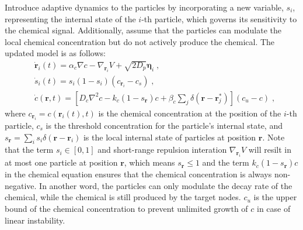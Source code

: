 \documentclass{article}
\begin{document}
Introduce adaptive dynamics to the particles by incorporating a new variable, $s_i$, representing the internal state of the $i$-th particle, which governs its sensitivity to the chemical signal. Additionally, assume that the particles can modulate the local chemical concentration but do not actively produce the chemical. The updated model is as follows:
\begin{subequations}
    \begin{align}
        &\dot{\mathbf{r}}_i\left( t \right) =\alpha _c\nabla c-\nabla _{\mathbf{r}_i}V+\sqrt{2D_p}\mathbf{\eta }_i \;,
        \\
        &\dot{s}_i\left( t \right) =s_i\left( 1-s_i \right) \left( c_{\mathbf{r}_i}-c_s \right) \;,
        \\
        &\dot{c}\left( \mathbf{r},t \right) =\left[ D_c\nabla ^2c-k_c\left( 1-s_{\mathbf{r}} \right) c+\beta _c\sum\nolimits_j^{}{\delta \left( \mathbf{r}-\mathbf{r}_{j}^{*} \right)} \right] \left( c_u-c \right) \;,
    \end{align}
    \label{eq:finalModel}
\end{subequations}
where $c_{\mathbf{r}_i}=c\left( \mathbf{r}_i\left( t \right) ,t \right) $ is the chemical concentration at the position of the $i$-th particle, $c_s$ is the threshold concentration for the particle's internal state, and $s_{\mathbf{r}}=\sum\nolimits_i^{}{s_i\delta \left( \mathbf{r}-\mathbf{r}_i \right)}$ is the local internal state of particles at position $\mathbf{r}$. Note that the term $s_i\in \left[ 0,1 \right]$ and short-range repulsion interation $\nabla _{\mathbf{r}_i}V$ will resilt in at most one particle at position $\mathbf{r}$, which means $s_{\mathbf{r}} \leqslant 1$ and the term $k_c\left( 1-s_{\mathbf{r}} \right) c$ in the chemical equation ensures that the chemical concentration is always non-negative. In another word, the particles can only modulate the decay rate of the chemical, while the chemical is still produced by the target nodes.
$c_u$ is the upper bound of the chemical concentration to prevent unlimited growth of $c$ in case of linear instability.
\end{document}
